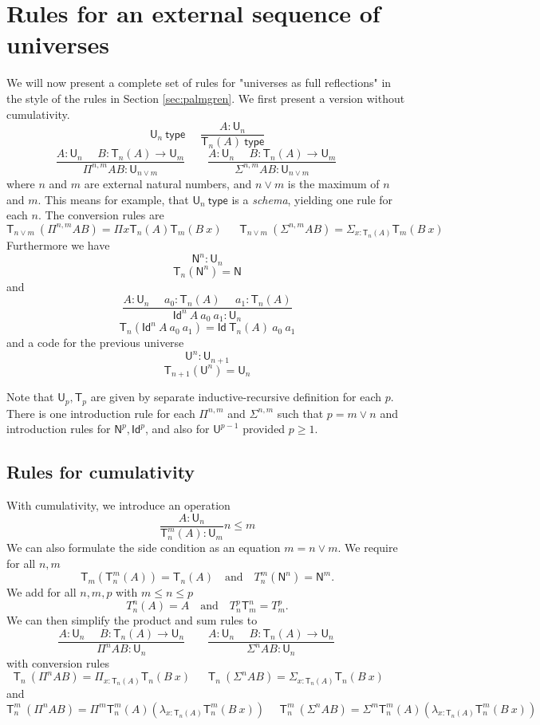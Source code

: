 \documentclass[11pt,a4paper]{article}
\newcommand{\Id}{\mathsf{Id}}
\def\NN{\mathsf{N}}
\def\UU{\mathsf{U}}
\newcommand{\type}{\mathsf{type}}
\newcommand{\mypi}[3]{\Pi_{#1:#2}#3}
\newcommand{\mylam}[3]{\lambda_{#1:#2}#3}
\newcommand{\mysig}[3]{\Sigma_{#1:#2}#3}
\newcommand{\T}{\mathsf{T}}
\begin{document}
\section{Rules for an external sequence of universes}

We will now present a complete set of rules for "universes as full reflections" in the style of the rules in Section \ref{sec:palmgren}.
We first present a version without cumulativity.
$$
\UU_n~\type~~~~~~
\frac{A:\UU_{n}}{\T_{n}(A)~\type}
$$
$$
\frac{A:\UU_{n}~~~~~~B:\T_{n}(A)\rightarrow \UU_{m}}
     {\Pi^{n,m} A B:\UU_{n\vee m}}~~~~~~~~~
\frac{A:\UU_{n}~~~~~~B:\T_{n}(A)\rightarrow \UU_{m}}
     {\Sigma^{n,m} A B:\UU_{n\vee m}}~~~~~~~~~
$$
where $n$ and $m$ are external natural numbers, and $n \vee m$ is the maximum of $n$ and $m$. This means for example, that $\UU_n~\type$ is a {\em schema}, yielding one rule for each $n$.
The conversion rules are
$$
\T_{n\vee m}~(\Pi^{n,m} A B) = \Pi {x}{\T_{n}(A)}{ \T_{m}(B~x)}~~~~~~~
\T_{n\vee m}~(\Sigma^{n,m} A B) = \mysig {x}{\T_{n}(A)}{ \T_{m}(B~x)}~~~~~~~
$$
Furthermore we have $$\NN^{n}:\UU_{n}$$
$$\T_{n}(\NN^{n}) = \NN$$
and
$$
\frac{A:\UU_n~~~~~~a_0:\T_n(A)~~~~~~a_1:\T_n(A)}
{\Id^n~A~a_0~a_1:\UU_n}
$$
$$\T_n(\Id^n~A~a_0~a_1) = \Id~\T_n(A)~a_0~a_1$$
and a code for the previous universe
$${\UU^{n}}:\UU_{n + 1}$$
$$\T_{n + 1}({\UU^{n}}) = \UU_{n}$$

Note that $\UU_p, \T_p$ are given by separate inductive-recursive definition for each $p$. There is one introduction rule for each $\Pi^{n,m}$ and $\Sigma^{n,m}$ such that $p = m \vee n$ and introduction rules for $\NN^p, \Id^p$, and also for $\UU^{p-1}$ provided $p \geq 1$.

\subsection*{Rules for cumulativity}

With cumulativity, we introduce an operation
$$
\frac{A:\UU_{n}}
{\T_{n}^{m}(A):\UU_{m}}
n\leqslant m
$$
We can also formulate the side condition as an equation $m = n \vee m$.
We require for all $n,m$
\[
\T_m(\T_{n}^{m}(A)) = \T_{n}(A) \quad\text{and}\quad T_{n}^{m}(\NN^{n}) = \NN^{m}.
\]
We add for all $n,m,p$ with $m\leqslant n\leqslant p$
$$
T_{n}^n(A) = A \quad\text{and}\quad T_{n}^p\T_{m}^n = T_m^p.
$$
We can then simplify the product and sum rules to
$$
\frac{A:\UU_{n}~~~~~~B:\T_{n}(A)\rightarrow \UU_{n}}
     {\Pi^{n} A B:\UU_{n}}~~~~~~~~~
\frac{A:\UU_{n}~~~~~~B:\T_{n}(A)\rightarrow \UU_{n}}
     {\Sigma^{n} A B:\UU_{n}}~~~~~~~~~
$$
with conversion rules
$$
\T_{n}~(\Pi^{n} A B) = \mypi{x}{\T_{n}(A)}{ \T_{n}(B~x)}~~~~~~~
\T_{n}~(\Sigma^{n} A B) = \mysig{x}{\T_{n}(A)}{ \T_{n}(B~x)}~~~~~~~
$$
and
$$
\T_{n}^{m}~(\Pi^{n} A B) = \Pi^{m} \T_{n}^{m}(A) (\mylam{x}{\T_{n}(A)}{\T_{n}^{m}(B~x)})~~~~~~
\T_{n}^{m}~(\Sigma^{n} A B) = \Sigma^{m} \T_{n}^{m}(A) (\mylam{x}{\T_{n}(A)}{\T_{n}^{m}(B~x)})~~~~~~
$$
\end{document}
